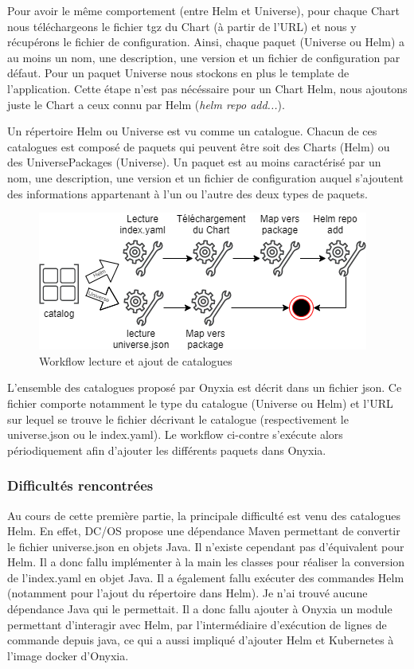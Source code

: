 \documentclass[11pt,fleqn]{book} %
\begin{document}
Pour avoir le même comportement (entre Helm et Universe), pour chaque Chart nous téléchargeons le fichier tgz du Chart (à partir de l'URL) et nous y récupérons le fichier de configuration. Ainsi, chaque paquet (Universe ou Helm) a au moins un nom, une description, une version et un fichier de configuration par défaut. Pour un paquet Universe nous stockons en plus le template de l'application. Cette étape n'est pas nécéssaire pour un Chart Helm, nous ajoutons juste le Chart a ceux connu par Helm (\textit{helm repo add...}).
\vspace{-0.5cm}
\begin{interrupt}
Un répertoire Helm ou Universe est vu comme un catalogue. Chacun de ces catalogues est composé de paquets qui peuvent être soit des Charts (Helm) ou des UniversePackages (Universe). Un paquet est au moins caractérisé par un nom, une description, une version et un fichier de configuration auquel s'ajoutent des informations appartenant à l'un ou l'autre des deux types de paquets.
\end{interrupt}

\begin{figure}
\renewcommand{\figurename}{Diagramme}
\includegraphics[scale=0.6]{Pictures/onyxia/workflow-catalog.png}
\caption{Workflow lecture et ajout de catalogues \newline}
\end{figure}
\vspace{-0.5cm}
L'ensemble des catalogues proposé par Onyxia est décrit dans un fichier json. Ce fichier comporte notamment le type du catalogue (Universe ou Helm) et l'URL sur lequel se trouve le fichier décrivant le catalogue (respectivement le universe.json ou le index.yaml). Le workflow ci-contre s'exécute alors périodiquement afin d'ajouter les différents paquets dans Onyxia.

\subsubsection{Difficultés rencontrées}
Au cours de cette première partie, la principale difficulté est venu des catalogues Helm. En effet, DC/OS propose une dépendance Maven permettant de convertir le fichier universe.json en objets Java. Il n'existe cependant pas d'équivalent pour Helm. Il a donc fallu implémenter à la main les classes pour réaliser la conversion de l'index.yaml en objet Java. Il a également fallu exécuter des commandes Helm (notamment pour l'ajout du répertoire dans Helm). Je n'ai trouvé aucune dépendance Java qui le permettait. Il a donc fallu ajouter à Onyxia un module permettant d'interagir avec Helm, par l'intermédiaire d'exécution de lignes de commande depuis java, ce qui a aussi impliqué d'ajouter Helm et Kubernetes à l'image docker d'Onyxia.
\end{document}
